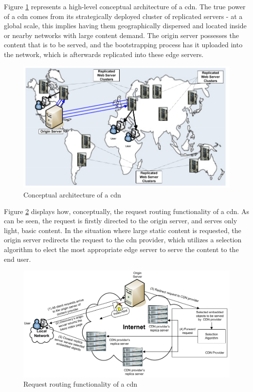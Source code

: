 \label{ssec:cdn-architecture}

    Figure \ref{fig:cdn-conceptual-architecture} represents a high-level conceptual architecture of a \gls{cdn}.
    The true power of a \gls{cdn} comes from its strategically deployed cluster of replicated servers - at a global scale, this implies having them geographically dispersed and located inside or nearby networks with large content demand.
    The origin server possesses the content that is to be served, and the bootstrapping process has it uploaded into the network, which is afterwards replicated into these edge servers.

\begin{figure}[!h]
\centering
\includegraphics[scale=0.65]{img/cdn-architecture.png}
\caption{Conceptual architecture of a \gls{cdn} \cite{cdn-survey}}
\label{fig:cdn-conceptual-architecture}
\end{figure}

    Figure \ref{fig:cdn-request-routing} displays how, conceptually, the request routing functionality of a \gls{cdn}.
    As can be seen, the request is firstly directed to the origin server, and serves only light, basic content.
    In the situation where large static content is requested, the origin server redirects the request to the \gls{cdn} provider, which utilizes a selection algorithm to elect the most appropriate edge server to serve the content to the end user.

\begin{figure}[ht]
\centering
\includegraphics[scale=0.5]{img/cdn-request-routing.png}
\caption{Request routing functionality of a \gls{cdn} \cite{cdn-survey}}
\label{fig:cdn-request-routing}
\end{figure}

